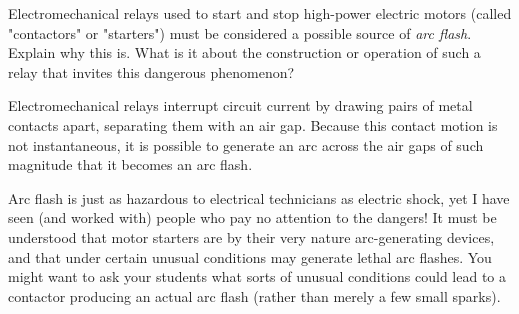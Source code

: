 

Electromechanical relays used to start and stop high-power electric motors (called "contactors" or "starters") must be considered a possible source of {\it arc flash}.  Explain why this is.  What is it about the construction or operation of such a relay that invites this dangerous phenomenon?







Electromechanical relays interrupt circuit current by drawing pairs of metal contacts apart, separating them with an air gap.  Because this contact motion is not instantaneous, it is possible to generate an arc across the air gaps of such magnitude that it becomes an arc flash.







Arc flash is just as hazardous to electrical technicians as electric shock, yet I have seen (and worked with) people who pay no attention to the dangers!  It must be understood that motor starters are by their very nature arc-generating devices, and that under certain unusual conditions may generate lethal arc flashes.  You might want to ask your students what sorts of unusual conditions could lead to a contactor producing an actual arc flash (rather than merely a few small sparks).




